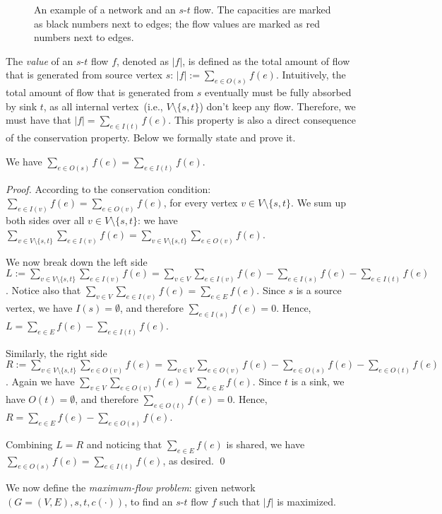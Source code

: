 \begin{figure}[h]
\centering{}
\caption{An example of a network and an $s$-$t$ flow.
The capacities are marked as black numbers next to edges;
the flow values are marked as red numbers next to edges.}
\label{fig:flow}
\end{figure}

The \emph{value} of an $s$-$t$ flow $f$, denoted as $|f|$,
is defined as the total amount of flow that is generated from source vertex $s$:
$|f| := \sum_{e\in O(s)} f(e)$. Intuitively, the total amount of flow that is generated
from $s$ eventually must be fully absorbed by sink $t$, as all internal vertex~(i.e., $V\setminus\{s,t\}$)
don't keep any flow. Therefore, we must have that 
$|f| = \sum_{e\in I(t)} f(e)$.  
This property is also a direct consequence of the conservation property.
Below we formally state and prove it.

\begin{fact}
We have $\sum_{e\in O(s)} f(e) = \sum_{e\in I(t)} f(e)$. 
\end{fact}

\emph{Proof.} According to the conservation condition:
$\sum_{e\in I(v)} f(e) = \sum_{e\in O(v)} f(e)$, 
for every vertex $v\in V\setminus\{s,t\}$. 
We sum up both sides over all $v\in V\setminus\{s,t\}$: 
we have $\sum_{v\in V\setminus\{s,t\}} \sum_{e\in I(v)} f(e) = \sum_{v\in V\setminus\{s,t\}} \sum_{e\in O(v)} f(e)$. 

We now break down the left side 
$L := \sum_{v\in V\setminus\{s,t\}} \sum_{e\in I(v)} f(e) 
= \sum_{v\in V} \sum_{e\in I(v)} f(e) -  \sum_{e\in I(s)} f(e) - \sum_{e\in I(t)} f(e)$.
Notice also that $\sum_{v\in V} \sum_{e\in I(v)} f(e) = \sum_{e\in E} f(e)$.
Since $s$ is a source vertex, we have $I(s) = \emptyset$, and therefore $\sum_{e\in I(s)} f(e)  = 0$.
Hence, $L = \sum_{e\in E} f(e) - \sum_{e\in I(t)} f(e)$.

Similarly, the right side 
$R := \sum_{v\in V\setminus\{s,t\}} \sum_{e\in O(v)} f(e) 
= \sum_{v\in V} \sum_{e\in O(v)} f(e) -  \sum_{e\in O(s)} f(e) - \sum_{e\in O(t)} f(e)$.
Again we have $\sum_{v\in V} \sum_{e\in O(v)} f(e) = \sum_{e\in E} f(e)$.
Since $t$ is a sink, we have $O(t) = \emptyset$, and therefore $\sum_{e\in O(t)} f(e)  = 0$.
Hence, $R = \sum_{e\in E} f(e) - \sum_{e\in O(s)} f(e)$.

Combining $L = R$ and noticing that $\sum_{e\in E} f(e)$ is shared, we have $\sum_{e\in O(s)} f(e) = \sum_{e\in I(t)} f(e)$, as desired.  \qed

We now define the \emph{maximum-flow problem}: given network $(G= (V, E), s, t, c(\cdot))$,
to find an $s$-$t$ flow $f$ such that $|f|$ is maximized.

